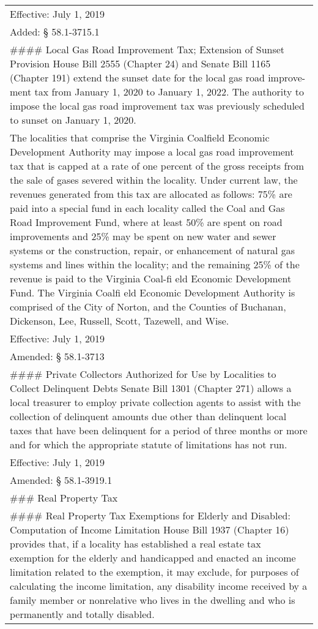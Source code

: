 \documentclass[
]{book}
\begin{document}
\begin{longtable}[]{@{}
  >{\raggedright\arraybackslash}p{}@{}}
Effective: July 1, 2019 \\
Added: § 58.1-3715.1 \\
\#\#\#\# Local Gas Road Improvement Tax; Extension of Sunset Provision
House Bill 2555 (Chapter 24) and Senate Bill 1165 (Chapter 191) extend the sunset date for the local gas road improve-ment tax from January 1, 2020 to January 1, 2022. The authority to impose the local gas road improvement tax was previously scheduled to sunset on January 1, 2020. \\
The localities that comprise the Virginia Coalfield Economic Development Authority may impose a local gas road improvement tax that is capped at a rate of one percent of the gross receipts from the sale of gases severed within the locality. Under current law, the revenues generated from this tax are allocated as follows: 75\% are paid into a special fund in each locality called the Coal and Gas Road Improvement Fund, where at least 50\% are spent on road improvements and 25\% may be spent on new water and sewer systems or the construction, repair, or enhancement of natural gas systems and lines within the locality; and the remaining 25\% of the revenue is paid to the Virginia Coal-fi eld Economic Development Fund. The Virginia Coalfi eld Economic Development Authority is comprised of the City of Norton, and the Counties of Buchanan, Dickenson, Lee, Russell, Scott, Tazewell, and Wise. \\
Effective: July 1, 2019 \\
Amended: § 58.1-3713 \\
\#\#\#\# Private Collectors Authorized for Use by Localities to Collect Delinquent Debts
Senate Bill 1301 (Chapter 271) allows a local treasurer to employ private collection agents to assist with the collection of delinquent amounts due other than delinquent local taxes that have been delinquent for a period of three months or more and for which the appropriate statute of limitations has not run. \\
Effective: July 1, 2019 \\
Amended: § 58.1-3919.1 \\
\#\#\# Real Property Tax \\
\#\#\#\# Real Property Tax Exemptions for Elderly and Disabled: Computation of Income Limitation
House Bill 1937 (Chapter 16) provides that, if a locality has established a real estate tax exemption for the elderly and handicapped and enacted an income limitation related to the exemption, it may exclude, for purposes of calculating the income limitation, any disability income received by a family member or nonrelative who lives in the dwelling and who is permanently and totally disabled. \\

\end{longtable}
\end{document}

